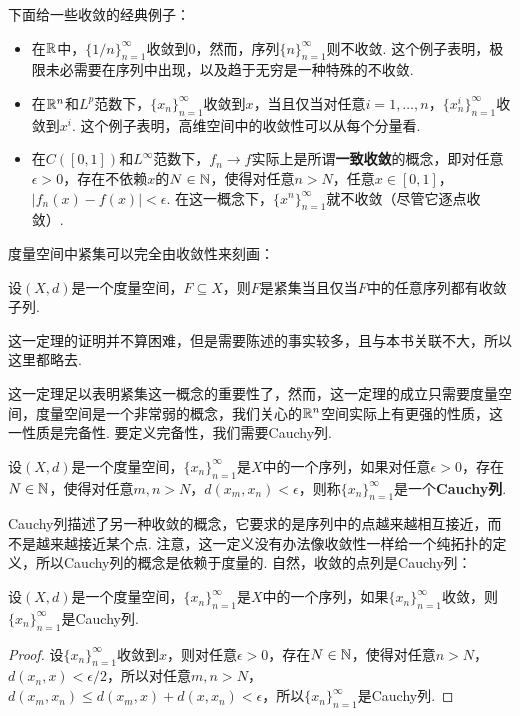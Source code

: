下面给一些收敛的经典例子：
\begin{example}
\begin{itemize}
    \item 在$\mathbb{R}$中，$\{1/n\}_{n=1}^\infty$收敛到$0$，然而，序列$\{n\}_{n=1}^\infty$则不收敛. 这个例子表明，极限未必需要在序列中出现，以及趋于无穷是一种特殊的不收敛.
    \item 在$\mathbb{R}^n$和$L^p$范数下，$\{x_n\}_{n=1}^\infty$收敛到$x$，当且仅当对任意$i=1,\dots,n$，$\{x_n^i\}_{n=1}^\infty$收敛到$x^i$. 这个例子表明，高维空间中的收敛性可以从每个分量看. 
    \item 在$C([0,1])$和$L^\infty$范数下，$f_n\to f$实际上是所谓\textbf{一致收敛}的概念，即对任意$\epsilon>0$，存在不依赖$x$的$N\in\mathbb{N}$，使得对任意$n>N$，任意$x\in[0,1]$，$|f_n(x)-f(x)|<\epsilon$. 在这一概念下，$\{x^n\}_{n=1}^\infty$就不收敛（尽管它逐点收敛）. 
\end{itemize}
\end{example}

度量空间中紧集可以完全由收敛性来刻画：

\begin{theorem}\label{thm:compact-converge}
    设$(X,d)$是一个度量空间，$F\subseteq X$，则$F$是紧集当且仅当$F$中的任意序列都有收敛子列. 
\end{theorem}
这一定理的证明并不算困难，但是需要陈述的事实较多，且与本书关联不大，所以这里都略去. 

这一定理足以表明紧集这一概念的重要性了，然而，这一定理的成立只需要度量空间，度量空间是一个非常弱的概念，我们关心的$\mathbb{R}^n$空间实际上有更强的性质，这一性质是完备性. 要定义完备性，我们需要Cauchy列. 

\begin{definition}[Cauchy列]
    设$(X,d)$是一个度量空间，$\{x_n\}_{n=1}^\infty$是$X$中的一个序列，如果对任意$\epsilon>0$，存在$N\in\mathbb{N}$，使得对任意$m,n>N$，$d(x_m,x_n)<\epsilon$，则称$\{x_n\}_{n=1}^\infty$是一个\textbf{Cauchy列}. 
\end{definition}

Cauchy列描述了另一种收敛的概念，它要求的是序列中的点越来越相互接近，而不是越来越接近某个点. 注意，这一定义没有办法像收敛性一样给一个纯拓扑的定义，所以Cauchy列的概念是依赖于度量的. 自然，收敛的点列是Cauchy列：

\begin{proposition}\label{prop:cauchy-converge}
    设$(X,d)$是一个度量空间，$\{x_n\}_{n=1}^\infty$是$X$中的一个序列，如果$\{x_n\}_{n=1}^\infty$收敛，则$\{x_n\}_{n=1}^\infty$是Cauchy列. 
\end{proposition}
\begin{proof}
    设$\{x_n\}_{n=1}^\infty$收敛到$x$，则对任意$\epsilon>0$，存在$N\in\mathbb{N}$，使得对任意$n>N$，$d(x_n,x)<\epsilon/2$，所以对任意$m,n>N$，$d(x_m,x_n)\leq d(x_m,x)+d(x,x_n)<\epsilon$，所以$\{x_n\}_{n=1}^\infty$是Cauchy列. 
\end{proof}

